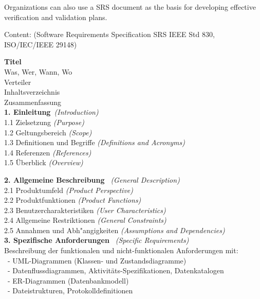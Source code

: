 Organizations can also use a SRS document as the basis for
developing effective verification and validation plans.

\newslide
Content: (Software Requirements Specification SRS IEEE Std 830, ISO/IEC/IEEE 29148)

\begin{tabbing}
{\bfseries\large Titel}\\
 Was, Wer, Wann, Wo\\
 Verteiler\\
 Inhaltsverzeichnis\\
 Zusammenfassung\\[1.5ex]
{\bfseries\large 1. Einleitung}{\em\ (Introduction)}\\
1.1 Zielsetzung {\em (Purpose)}\\
1.2 Geltungsbereich {\em (Scope)}\\
1.3 Definitionen und Begriffe {\em (Definitions and Acronyms)}\\
1.4 Referenzen {\em (References)}\\
1.5 \"Uberblick {\em (Overview)}\\[1.5ex]
\ifslides
\end{tabbing}
\newslide
\begin{tabbing}
\fi
{\bfseries\large 2. Allgemeine Beschreibung} {\em\ (General Description)}\\
2.1 Produktumfeld {\em (Product Perspective)}\\
2.2 Produktfunktionen {\em (Product Functions)}\\
2.3 Benutzercharakteristiken {\em (User Characteristics)}\\
2.4 Allgemeine Restriktionen {\em (General Constraints)}\\
2.5 Annahmen und Abh"angigkeiten {\em (Assumptions and Dependencies)}\\[1.5ex]
{\bfseries\large 3. Spezifische Anforderungen} {\em\ (Specific Requirements)}\\
Beschreibung der funktionalen und nicht-funktionalen Anforderungen
mit:\\
\ - UML-Diagrammen (Klassen- und Zustandsdiagramme)\\
\ - Datenflussdiagrammen, Aktivit\"ats-Spezifikationen, Datenkatalogen\\
\ - ER-Diagrammen (Datenbankmodell)\\
\ - Dateistrukturen, Protokolldefinitionen\\
\end{tabbing}
%

